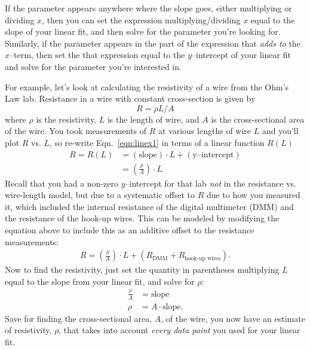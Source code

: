\documentclass[10pt,letterpaper,twoside]{article}
\begin{document}
If the parameter appears anywhere where the slope goes, either multiplying or dividing $x$, then you can set the expression multiplying/dividing $x$ equal to the slope of your linear fit, and then solve for the parameter you're looking for.
Similarly, if the parameter appears in the part of the expression that \textit{adds to} the $x$--term, then set the that expression equal to the $y$--intercept of your linear fit and solve for the parameter you're interested in.

For example, let's look at calculating the resistivity of a wire from the Ohm's Law lab.
Resistance in a wire with constant cross-section is given by
\begin{equation}
  R = \rho L / A \label{eqn:linex1}
\end{equation}
where $\rho$ is the resistivity, $L$ is the length of wire, and $A$ is the cross-sectional area of the wire.
You took measurements of $R$ at various lengths of wire $L$ and you'll plot $R$ vs. $L$, so re-write Eqn.~\ref{eqn:linex1} in terms of a linear function $R(L)$
\begin{align}
  R = R(L) &= (\mathrm{slope})\cdot L + (\text{y--intercept}) \\
  &= \left( \frac{\rho}{A} \right)\cdot L
\end{align}
Recall that you had a non-zero $y$--intercept for that lab \textit{not} in the resistance vs. wire-length model, but due to a systematic offset to $R$ due to how you measured it, which included the internal resistance of the digital multimeter (DMM) and the resistance of the hook-up wires.
This can be modeled by modifying the equation above to include this as an additive offset to the resistance measurements:
\begin{align}
  R = \left( \frac{\rho}{A} \right)\cdot L + \left( R_{\text{DMM}} + R_{\text{hook-up wires}} \right).
\end{align}
Now to find the resistivity, just set the quantity in parentheses multiplying $L$ equal to the slope from your linear fit, and solve for $\rho$:
\begin{align}
  \frac{\rho}{A} &= \mathrm{slope}  \\
  \rho &= A\cdot \mathrm{slope}.
\end{align}
Save for finding the cross-sectional area, $A$, of the wire, you now have an estimate of resistivity, $\rho$, that takes into account \textit{every data point} you used for your linear fit.
\end{document}
